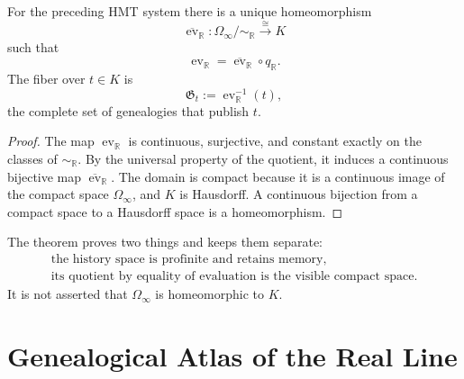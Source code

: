 \begin{theorem}
\label{p12-83-c18-s1:thm:homeomorfismo-cociente-compacto-u024}
For the preceding HMT system there is a unique homeomorphism
\begin{equation}
 \overline{\operatorname{ev}}_{\mathbb R}:
 \Omega_\infty/\!\sim_{\mathbb R}
 \xrightarrow{\ \cong\ }K
 \label{p12-83-c18-s1:eq:homeomorfismo-cociente-compacto-u024}
\end{equation}
such that
\begin{equation}
 \operatorname{ev}_{\mathbb R}
 =\overline{\operatorname{ev}}_{\mathbb R}\circ q_{\mathbb R}.
 \label{p12-83-c18-s1:eq:factorizacion-evaluacion-cociente}
\end{equation}
The fiber over \(t\in K\) is
\begin{equation}
 \mathfrak G_t
 :=\operatorname{ev}_{\mathbb R}^{-1}(t),
 \label{p12-83-c18-s1:eq:fibra-genealogias-mismo-valor}
\end{equation}
the complete set of genealogies that publish \(t\).
\end{theorem}

\begin{proof}
The map \(\operatorname{ev}_{\mathbb R}\) is continuous, surjective, and
constant exactly on the classes of \(\sim_{\mathbb R}\). By the
universal property of the quotient, it induces a continuous bijective map
\(\overline{\operatorname{ev}}_{\mathbb R}\). The domain is compact because it is a continuous
image of the compact space \(\Omega_\infty\), and \(K\) is Hausdorff.
A continuous bijection from a compact space to a Hausdorff space is a homeomorphism.
\end{proof}

The theorem proves two things and keeps them separate:
\begin{equation}
 \boxed{
 \begin{array}{c}
 \text{the history space is profinite and retains memory,}\\
 \text{its quotient by equality of evaluation is the visible compact space.}
 \end{array}}
 \label{p12-83-c18-s1:eq:dos-niveles-continuo-u024}
\end{equation}
It is not asserted that \(\Omega_\infty\) is homeomorphic to \(K\).

\section{Genealogical Atlas of the Real Line}

